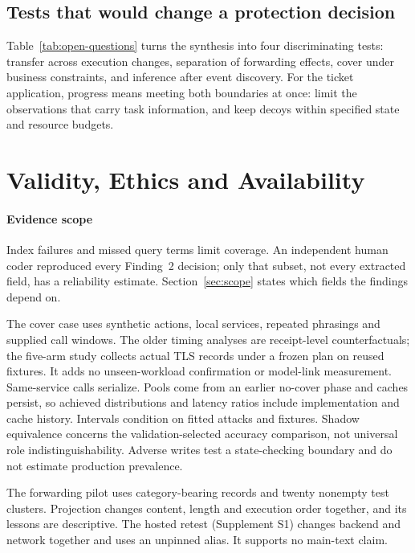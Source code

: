 \subsection{Tests that would change a protection decision}
Table~\ref{tab:open-questions} turns the synthesis into four discriminating tests: transfer across execution changes, separation of forwarding effects, cover under business constraints, and inference after event discovery. For the ticket application, progress means meeting both boundaries at once: limit the observations that carry task information, and keep decoys within specified state and resource budgets.

\section{Validity, Ethics and Availability}\label{sec:validity}
\paragraph{Evidence scope}
Index failures and missed query terms limit coverage. An independent human coder reproduced every Finding~2 decision; only that subset, not every extracted field, has a reliability estimate. Section~\ref{sec:scope} states which fields the findings depend on.

The cover case uses synthetic actions, local services, repeated phrasings and supplied call windows. The older timing analyses are receipt-level counterfactuals; the five-arm study collects actual TLS records under a frozen plan on reused fixtures. It adds no unseen-workload confirmation or model-link measurement. Same-service calls serialize. Pools come from an earlier no-cover phase and caches persist, so achieved distributions and latency ratios include implementation and cache history. Intervals condition on fitted attacks and fixtures. Shadow equivalence concerns the validation-selected accuracy comparison, not universal role indistinguishability. Adverse writes test a state-checking boundary and do not estimate production prevalence.

The forwarding pilot uses category-bearing records and twenty nonempty test clusters. Projection changes content, length and execution order together, and its lessons are descriptive. The hosted retest (Supplement S1) changes backend and network together and uses an unpinned alias. It supports no main-text claim.

